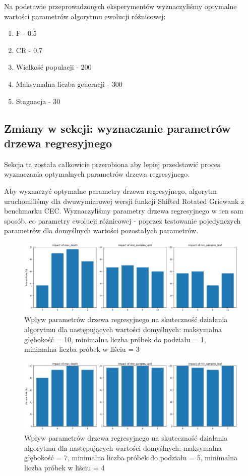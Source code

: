 \documentclass{article}
\begin{document}
Na podstawie przeprowadzonych eksperymentów wyznaczyliśmy optymalne wartości parametrów algorytmu ewolucji różnicowej:
\begin{enumerate}
    \item F - 0.5
    \item CR - 0.7
    \item Wielkość populacji - 200
    \item Maksymalna liczba generacji - 300
    \item Stagnacja - 30
\end{enumerate}

\subsection{Zmiany w sekcji: wyznaczanie parametrów drzewa regresyjnego}

Sekcja ta została całkowicie przerobiona aby lepiej przedstawić proces wyznaczania optymalnych parametrów drzewa regresyjnego.

Aby wyznaczyć optymalne parametry drzewa regresyjnego, algorytm uruchomiliśmy dla dwuwymiarowej wersji funkcji Shifted Rotated Griewank z benchmarku CEC. Wyznaczyliśmy parametry drzewa regresyjnego w ten sam sposób, co parametry ewolucji różnicowej - poprzez testowanie pojedynczych parametrów dla domyślnych wartości pozostałych parametrów.

\begin{figure}[H]
    \centering
    \includegraphics[width=\textwidth]{tree_parameter_tuning_separate_results2.png}
    \caption{Wpływ parametrów drzewa regresyjnego na skuteczność działania algorytmu dla następujących wartości domyślnych: maksymalna głębokość = 10, minimalna liczba próbek do podziału = 1, minimalna liczba próbek w liściu = 3}
    \label{fig:tree_parameter_results1}
\end{figure}

\begin{figure}[H]
    \centering
    \includegraphics[width=\textwidth]{tree_parameter_tuning_separate_results3.png}
    \caption{Wpływ parametrów drzewa regresyjnego na skuteczność działania algorytmu dla następujących wartości domyślnych: maksymalna głębokość = 7, minimalna liczba próbek do podziału = 5, minimalna liczba próbek w liściu = 4}
    \label{fig:tree_parameter_results2}
\end{figure}
\end{document}
